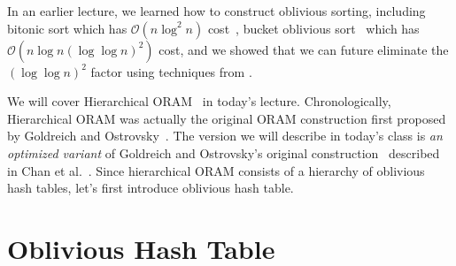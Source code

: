 \newcommand{\rsmpl}{\xleftarrow{\$}}

\newcommand{\alg}{\textsc{Alg}}

\newcommand{\ap}{\textsc{AccessPattern}}
\newtheorem{nonexample}[theorem]{Non-Example}


In an earlier lecture, we learned how to construct oblivious sorting, including bitonic sort which has $\mathcal{O}(n \log^2 n)$ cost~\cite{Batcher}, bucket oblivious sort~\cite{bucket} which has $\mathcal{O}(n \log n (\log \log n)^2)$ cost, 
and we showed that we can future eliminate the $(\log \log n)^2$ factor using
techniques from 
\cite{domulticore, tianyao-sort}.

We will cover Hierarchical ORAM~\cite{10.1145/233551.233553} 
in today's lecture.
Chronologically, 
Hierarchical ORAM 
was actually the original ORAM construction  
first proposed by Goldreich and Ostrovsky~\cite{10.1145/233551.233553}. 
The version we will describe in today's class
is {\it an optimized variant} of Goldreich and Ostrovsky's original
construction~\cite{10.1145/233551.233553}
described in Chan et al.~\cite{ohash}.
Since hierarchical ORAM consists of a hierarchy of oblivious hash tables,
let's first introduce oblivious hash table.

\section{Oblivious Hash Table}

